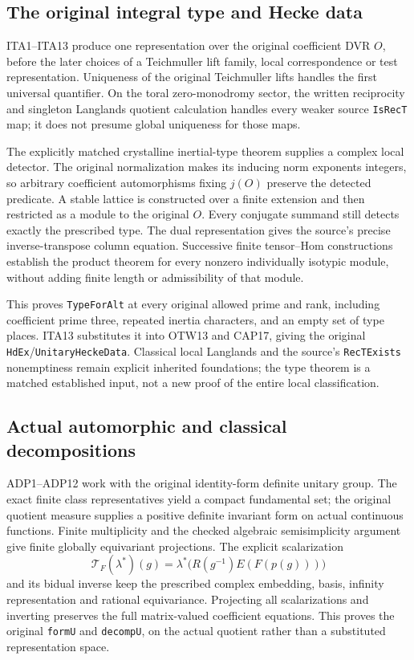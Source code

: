 \subsection{The original integral type and Hecke data}

ITA1--ITA13 produce one representation over the original coefficient
DVR $O$, before the later choices of a Teichmuller lift family,
local correspondence or test representation. Uniqueness of the original
Teichmuller lifts handles the first universal quantifier. On the toral
zero-monodromy sector, the written reciprocity and singleton Langlands
quotient calculation handles every weaker source \texttt{Is\allowbreak Rec\allowbreak T} map;
it does not presume global uniqueness for those maps.

The explicitly matched crystalline inertial-type theorem supplies a
complex local detector. The original normalization makes its inducing
norm exponents integers, so arbitrary coefficient automorphisms fixing
$j(O)$ preserve the detected predicate. A stable lattice is constructed
over a finite extension and then restricted as a module to the original
$O$. Every conjugate summand still detects exactly the prescribed type.
The dual representation gives the source's precise inverse-transpose
column equation. Successive finite tensor--Hom constructions establish
the product theorem for every nonzero individually isotypic module,
without adding finite length or admissibility of that module.

This proves \texttt{Type\allowbreak For\allowbreak Alt} at every original allowed prime and
rank, including coefficient prime three, repeated inertia characters,
and an empty set of type places. ITA13 substitutes it into OTW13 and
CAP17, giving the original \texttt{Hd\allowbreak Ex}/\texttt{Unitary\allowbreak Hecke\allowbreak Data}.
Classical local Langlands and the source's \texttt{Rec\allowbreak TExists}
nonemptiness remain explicit inherited foundations; the type theorem
is a matched established input, not a new proof of the entire local
classification.

\subsection{Actual automorphic and classical decompositions}

ADP1--ADP12 work with the original identity-form definite unitary group.
The exact finite class representatives yield a compact fundamental set;
the original quotient measure supplies a positive definite invariant
form on actual continuous functions. Finite multiplicity and the
checked algebraic semisimplicity argument give finite globally
equivariant projections. The explicit scalarization
\[
 \mathcal T_F(\lambda^*)(g)
  =\lambda^*\bigl(R(g^{-1})E(F(p(g)))\bigr)
\]
and its bidual inverse keep the prescribed complex embedding, basis,
infinity representation and rational equivariance. Projecting all
scalarizations and inverting preserves the full matrix-valued
coefficient equations. This proves the original \texttt{form\allowbreak U} and
\texttt{decomp\allowbreak U}, on the actual quotient rather than a substituted
representation space.

